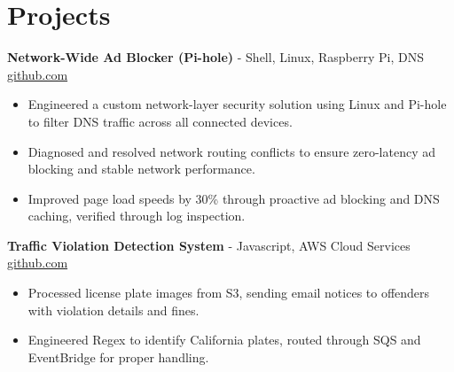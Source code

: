 \documentclass[11pt]{article}       %
\begin{document}
\vspace{-18.5pt}

\section*{Projects}

\textbf{Network-Wide Ad Blocker (Pi-hole)}{ - Shell, Linux, Raspberry Pi, DNS} \hfill \href{https://github.com/Monica20030707}{github.com} \\
\vspace{-9pt}
\begin{itemize}
  \item Engineered a custom network-layer security solution using Linux and Pi-hole to filter DNS traffic across all connected devices.
  \item Diagnosed and resolved network routing conflicts to ensure zero-latency ad blocking and stable network performance.
  \item Improved page load speeds by 30\% through proactive ad blocking and DNS caching, verified through log inspection.
\end{itemize}


\textbf{Traffic Violation Detection System}{ - Javascript, AWS Cloud Services} \hfill \href{https://github.com/Monica20030707/AWS_rekonigition-N-read-database}{github.com} \\
\vspace{-9pt}
\begin{itemize}
  \item Processed license plate images from S3, sending email notices to offenders with violation details and fines.
  \item Engineered Regex to identify California plates, routed through SQS and EventBridge for proper handling.
\end{itemize}
\end{document}
